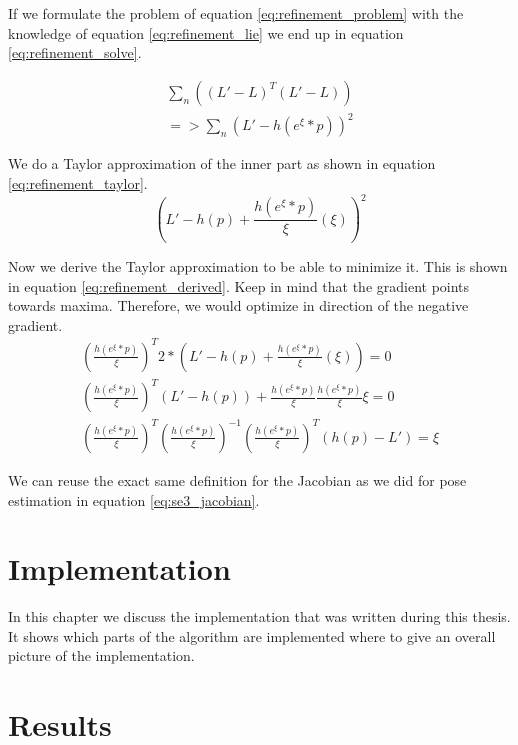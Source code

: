 \documentclass[11pt,a4paper,titlepage,oneside]{report}
\begin{document}
If we formulate the problem of equation \ref{eq:refinement_problem} with the knowledge of equation \ref{eq:refinement_lie} we end up in equation \ref{eq:refinement_solve}.

\begin{equation}\label{eq:refinement_solve}
  \begin{gathered}
    \sum_n ((L'-L)^T(L'-L))\\
    =>\sum_n (L'-h(e^{\xi}*p))^2
  \end{gathered}
\end{equation}

We do a Taylor approximation of the inner part as shown in equation \ref{eq:refinement_taylor}.
\begin{equation}\label{eq:refinement_taylor}
  (L'-h(p)+\frac{h(e^{\xi}*p)}{\xi}(\xi))^2
\end{equation}

Now we derive the Taylor approximation to be able to minimize it. This is shown in equation \ref{eq:refinement_derived}. Keep in mind that the gradient points towards maxima. Therefore, we would optimize in direction of the negative gradient.
\begin{equation}\label{eq:refinement_derived}
  \begin{gathered}
    (\frac{h(e^{\xi}*p)}{\xi})^T2*(L'-h(p)+\frac{h(e^{\xi}*p)}{\xi}(\xi))=0\\
    (\frac{h(e^{\xi}*p)}{\xi})^T(L'-h(p))+\frac{h(e^{\xi}*p)}{\xi}\frac{h(e^{\xi}*p)}{\xi}\xi=0\\
    (\frac{h(e^{\xi}*p)}{\xi})^T(\frac{h(e^{\xi}*p)}{\xi})^{-1}(\frac{h(e^{\xi}*p)}{\xi})^T(h(p)-L')=\xi
  \end{gathered}
\end{equation}

We can reuse the exact same definition for the Jacobian as we did for pose estimation in equation \ref{eq:se3_jacobian}.

\chapter{Implementation}

In this chapter we discuss the implementation that was written during this thesis. It shows which parts of the algorithm are implemented where to give an overall picture of the implementation.

\chapter{Results}
\end{document}
